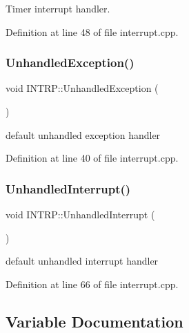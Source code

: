 Timer interrupt handler. 



Definition at line 48 of file interrupt.\+cpp.

\mbox{\label{namespace_i_n_t_r_p_a7732859732913734b09dd07030c41991}} 
\subsubsection{\texorpdfstring{Unhandled\+Exception()}{UnhandledException()}}
{\footnotesize\ttfamily void I\+N\+T\+R\+P\+::\+Unhandled\+Exception (\begin{DoxyParamCaption}{ }\end{DoxyParamCaption})}



default unhandled exception handler 



Definition at line 40 of file interrupt.\+cpp.

\mbox{\label{namespace_i_n_t_r_p_a13c03019c9d7b305743516310096a82a}} 
\subsubsection{\texorpdfstring{Unhandled\+Interrupt()}{UnhandledInterrupt()}}
{\footnotesize\ttfamily void I\+N\+T\+R\+P\+::\+Unhandled\+Interrupt (\begin{DoxyParamCaption}{ }\end{DoxyParamCaption})}



default unhandled interrupt handler 



Definition at line 66 of file interrupt.\+cpp.



\subsection{Variable Documentation}
\mbox{\label{namespace_i_n_t_r_p_a1022b4dc1d9af1ea393f7f038ff421ce}} 
